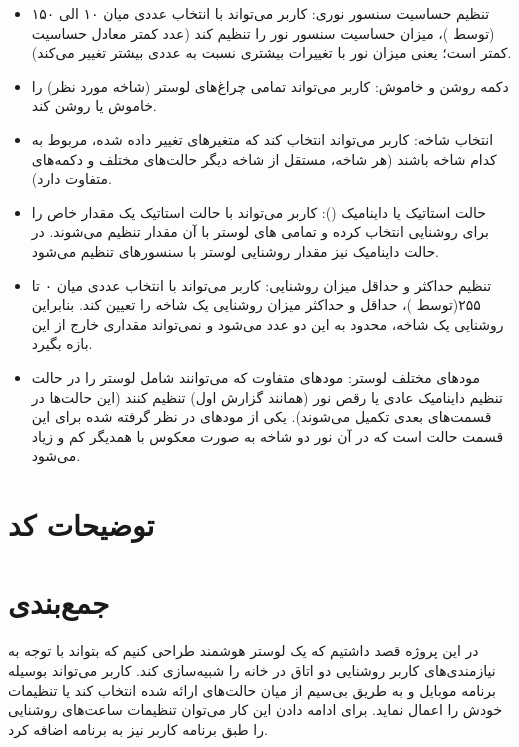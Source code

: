 \documentclass[12pt,a4paper]{article}
\begin{document}
	\begin{itemize}
		\item 
		{تنظیم حساسیت سنسور نوری:} کاربر می‌تواند با انتخاب عددی میان ۱۰ الی ۱۵۰ (توسط )، میزان حساسیت سنسور نور را تنظیم کند (عدد کمتر معادل حساسیت کمتر است؛ یعنی میزان نور با تغییرات بیشتری نسبت به عددی بیشتر تغییر می‌کند).
		\item 
		{دکمه روشن و خاموش:} کاربر می‌تواند تمامی چراغ‌های لوستر (شاخه مورد نظر) را خاموش یا روشن کند.
		\item 
		{انتخاب شاخه:} کاربر می‌تواند انتخاب کند که متغیرهای تغییر داده شده، مربوط به کدام شاخه باشند (هر شاخه، مستقل از شاخه دیگر حالت‌های مختلف و دکمه‌های متفاوت دارد).
		\item 
		{حالت استاتیک یا داینامیک ():} کاربر می‌تواند با حالت استاتیک یک مقدار خاص را برای روشنایی انتخاب کرده و تمامی  های لوستر با آن مقدار تنظیم می‌شوند. در حالت داینامیک نیز مقدار روشنایی لوستر با سنسورهای تنظیم می‌شود.
		\item 
		{تنظیم حداکثر و حداقل میزان روشنایی:} کاربر می‌تواند با انتخاب عددی میان ۰ تا ۲۵۵(توسط )، حداقل و حداکثر میزان روشنایی یک شاخه را تعیین کند. بنابراین روشنایی یک شاخه، محدود به این دو عدد می‌شود و نمی‌تواند مقداری خارج از این بازه بگیرد.
		\item 
		{مودهای مختلف لوستر:} مودهای متفاوت که می‌توانند شامل لوستر را در حالت تنظیم داینامیک عادی یا رقص نور (همانند گزارش اول) تنظیم کنند (این حالت‌ها در قسمت‌های بعدی تکمیل می‌شوند). یکی از مودهای در نظر گرفته شده برای این قسمت حالت  است که در آن نور دو شاخه به صورت معکوس با همدیگر کم و زیاد می‌شود.
		
	\end{itemize}
\newpage
	\section{توضیحات کد}
	
	
	
	
	\newpage
	\section*{جمع‌بندی}
در این پروژه قصد داشتیم که یک  لوستر هوشمند طراحی کنیم که بتواند با توجه به نیازمندی‌های کاربر روشنایی دو اتاق در خانه را شبیه‌سازی کند. کاربر می‌تواند بوسیله برنامه موبایل و به طریق بی‌سیم از میان حالت‌های ارائه شده انتخاب کند یا تنظیمات خودش را اعمال نماید. برای ادامه دادن این کار می‌توان تنظیمات ساعت‌های روشنایی را طبق برنامه کاربر نیز به برنامه اضافه کرد.
\end{document}
